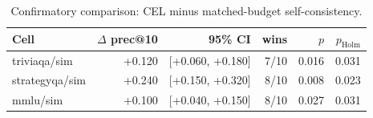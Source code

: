 \begin{table}[t]
\centering
\small
\begin{tabular}{lrrrrr}
\toprule
Cell & $\Delta$ prec@10 & 95\% CI & wins & $p$ & $p_{\mathrm{Holm}}$ \\
\midrule
triviaqa/sim & +0.120 & [+0.060, +0.180] & 7/10 & 0.016 & 0.031 \\
strategyqa/sim & +0.240 & [+0.150, +0.320] & 8/10 & 0.008 & 0.023 \\
mmlu/sim & +0.100 & [+0.040, +0.150] & 8/10 & 0.027 & 0.031 \\
\bottomrule
\end{tabular}
\caption{Confirmatory comparison: CEL minus matched-budget self-consistency.}
\label{tab:confirmatory}
\end{table}
